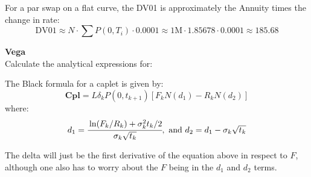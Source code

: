 \documentclass[12pt,a4paper]{exam}
\begin{document}
\begin{questions}
\begin{solution}
	For a par swap on a flat curve, the DV01 is approximately the Annuity times the change in rate:
	\begin{equation*}
		\text{DV}01 \approx N\cdot\sum P(0,T_i)\cdot 0.0001 \approx 1\text{M}\cdot 1.85678 \cdot 0.0001 \approx 185.68
	\end{equation*}
\end{solution}

\question \textbf{Vega} \\
Calculate the analytical expressions for:


\begin{solution}
	The Black formula for a caplet is given by:
	\begin{equation*}
		\textbf{Cpl} = L\delta_k P(0,t_{k+1})[F_k N(d_1)-R_k N(d_2)]
	\end{equation*}
	where:
	\begin{equation*}
		d_1 =\cfrac{\ln(F_k/R_k)+\sigma^2_k t_k/2}{\sigma_k \sqrt{t_k}},\text{ and } d_2 = d_1-\sigma_k \sqrt{t_k}
	\end{equation*}

	The delta will just be the first derivative of the equation above in respect to $F$, although one also has to worry about the $F$ being in the $d_1$ and $d_2$ terms.


\end{solution}
\end{questions}
\end{document}
